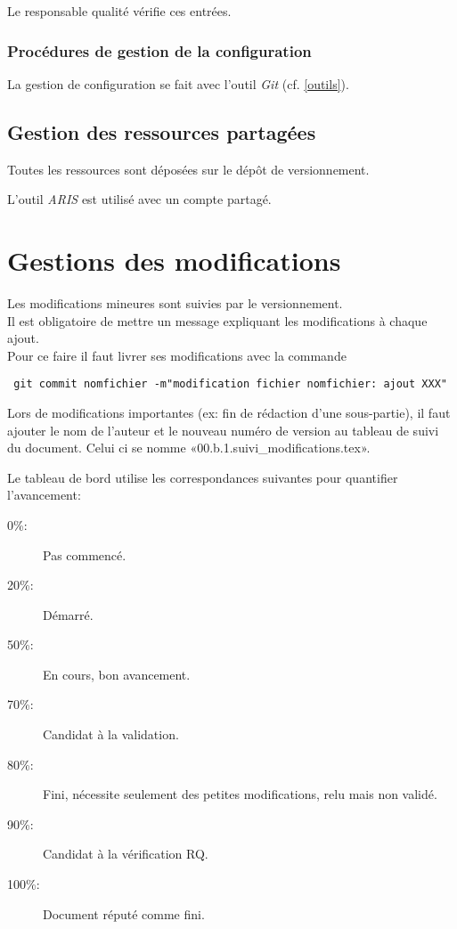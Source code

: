 \documentclass[twoside]{article}
\begin{document}
Le responsable qualité vérifie ces entrées.

\subsubsection{Procédures de gestion de la configuration}
La gestion de configuration se fait avec l'outil \textsl{Git} (cf. \ref{outils}).


\subsection{Gestion des ressources partagées}
Toutes les ressources sont déposées sur le dépôt de versionnement.

L'outil \textsl{ARIS} est utilisé avec un compte partagé.


\section{Gestions des modifications}

Les modifications mineures sont suivies par le versionnement.\\
Il est obligatoire de mettre un message
expliquant les modifications à chaque ajout.\\
Pour ce faire il faut livrer ses modifications avec la commande
\begin{verbatim}
 git commit nomfichier -m"modification fichier nomfichier: ajout XXX"
\end{verbatim}
Lors de modifications importantes (ex: fin de rédaction d'une
sous-partie), il faut ajouter le nom de l'auteur
et le nouveau numéro de version au tableau de suivi du document.
Celui ci se nomme «00.b.1.suivi\_modifications.tex».


Le tableau de bord utilise les correspondances suivantes pour quantifier
l'avancement:
\begin{description}
    \item[0\%:]  Pas commencé.
    \item[20\%:] Démarré.
    \item[50\%:] En cours, bon avancement.
    \item[70\%:] Candidat à la validation. 
    \item[80\%:] Fini, nécessite seulement des petites modifications,
                    relu mais non validé.
    \item[90\%:] Candidat à la vérification RQ. 
    \item[100\%:]Document réputé comme fini.
\end{description}
\end{document}
